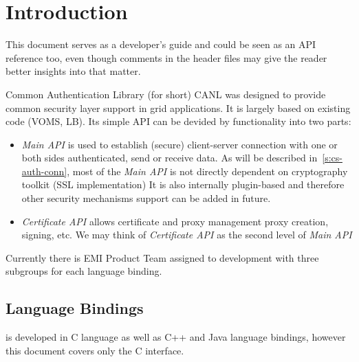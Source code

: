 %
%

\section{Introduction}

This document serves as a developer's guide and could be
seen as an API reference too, even though comments in
the header files may give the reader better insights into that matter.

Common Authentication Library (\CANL for short)
CANL was designed to provide common security layer support in grid 
applications. It is largely based on existing code (VOMS, LB). Its 
simple API can be devided by functionality into two parts:

\begin{itemize}
\item \textit{\CANL Main API} is used to establish (secure) client-server
connection with one or both sides authenticated, send or receive data.
As will be described in~\ref{s:cs-auth-conn}, most of the \textit{Main API} 
is not directly dependent on cryptography toolkit (SSL implementation) It is
also internally plugin-based and therefore other security mechanisms support can
be added in future.
\item \textit{\CANL Certificate API} allows certificate and proxy management \eg
proxy creation, signing, etc. We may think of \textit{Certificate API} as the
second level of \textit{Main API}
\end{itemize}

Currently there is EMI Product Team assigned to \CANL development with three
subgroups for each language binding.

\subsection{Language Bindings}
\CANL is developed in C language as well as C++ and Java language bindings,
however this document covers only the C interface.

